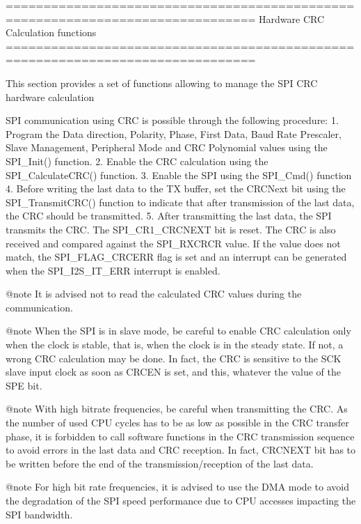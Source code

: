 \begin{DoxyVerb} ===============================================================================
                         Hardware CRC Calculation functions
 ===============================================================================  

  This section provides a set of functions allowing to manage the SPI CRC hardware 
  calculation

  SPI communication using CRC is possible through the following procedure:
     1. Program the Data direction, Polarity, Phase, First Data, Baud Rate Prescaler, 
        Slave Management, Peripheral Mode and CRC Polynomial values using the SPI_Init()
        function.
     2. Enable the CRC calculation using the SPI_CalculateCRC() function.
     3. Enable the SPI using the SPI_Cmd() function
     4. Before writing the last data to the TX buffer, set the CRCNext bit using the 
      SPI_TransmitCRC() function to indicate that after transmission of the last 
      data, the CRC should be transmitted.
     5. After transmitting the last data, the SPI transmits the CRC. The SPI_CR1_CRCNEXT
        bit is reset. The CRC is also received and compared against the SPI_RXCRCR 
        value. 
        If the value does not match, the SPI_FLAG_CRCERR flag is set and an interrupt
        can be generated when the SPI_I2S_IT_ERR interrupt is enabled.

@note It is advised not to read the calculated CRC values during the communication.

@note When the SPI is in slave mode, be careful to enable CRC calculation only 
      when the clock is stable, that is, when the clock is in the steady state. 
      If not, a wrong CRC calculation may be done. In fact, the CRC is sensitive 
      to the SCK slave input clock as soon as CRCEN is set, and this, whatever 
      the value of the SPE bit.

@note With high bitrate frequencies, be careful when transmitting the CRC.
      As the number of used CPU cycles has to be as low as possible in the CRC 
      transfer phase, it is forbidden to call software functions in the CRC 
      transmission sequence to avoid errors in the last data and CRC reception. 
      In fact, CRCNEXT bit has to be written before the end of the transmission/reception 
      of the last data.

@note For high bit rate frequencies, it is advised to use the DMA mode to avoid the
      degradation of the SPI speed performance due to CPU accesses impacting the 
      SPI bandwidth.


\end{DoxyVerb}

